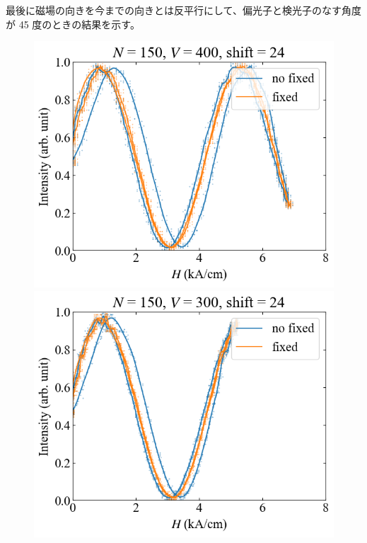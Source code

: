 \documentclass[9pt,dvipdfmx,a4paper]{jsarticle}
\begin{document}
最後に磁場の向きを今までの向きとは反平行にして、偏光子と検光子のなす角度が 45 度のときの結果を示す。
\begin{figure}[H]
    \centering
    \begin{minipage}[t]{0.24\columnwidth}
        \centering
        \includegraphics[width = \columnwidth]{xy/22.png}
    \end{minipage}
    \hfill
    \begin{minipage}[t]{0.24\columnwidth}
        \centering
        \includegraphics[width = \columnwidth]{xy/23.png}
    \end{minipage}

\end{figure}
\end{document}
